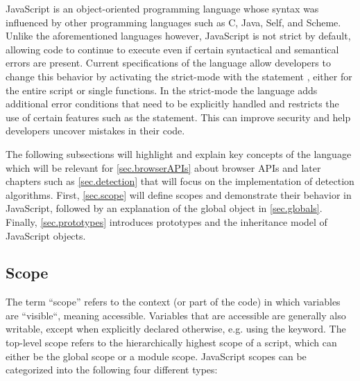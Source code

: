 JavaScript is an object-oriented programming language whose syntax was influenced by other programming languages such as C, Java, Self, and Scheme. Unlike the aforementioned languages however, JavaScript is not strict by default, allowing code to continue to execute even if certain syntactical and semantical errors are present. Current specifications of the language allow developers to change this behavior by activating the strict-mode with the statement , either for the entire script or single functions. In the strict-mode the language adds additional error conditions that need to be explicitly handled and restricts the use of certain features such as the  statement. This can improve security and help developers uncover mistakes in their code. \cite{ECMA262_edition6}

The following subsections will highlight and explain key concepts of the language which will be relevant for \autoref{sec.browserAPIs} about browser APIs and later chapters such as \autoref{sec.detection} that will focus on the implementation of detection algorithms. First, \autoref{sec.scope} will define scopes and demonstrate their behavior in JavaScript, followed by an explanation of the global object in \autoref{sec.globals}. Finally, \autoref{sec.prototypes} introduces prototypes and the inheritance model of JavaScript objects.



\subsection{Scope}
\label{sec.scope}

The term “scope” refers to the context (or part of the code) in which variables are “visible“, meaning accessible. Variables that are accessible are generally also writable, except when explicitly declared otherwise, e.g. using the  keyword. The top-level scope refers to the hierarchically highest scope of a script, which can either be the global scope or a module scope. JavaScript scopes can be categorized into the following four different types:

